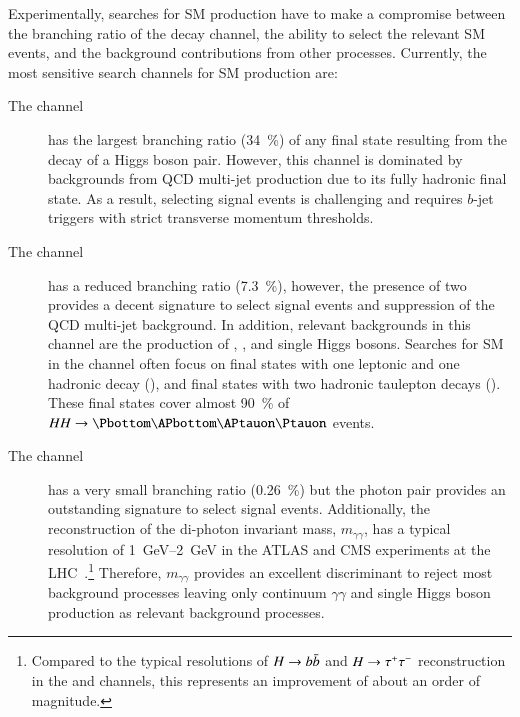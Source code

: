 Experimentally, searches for SM \HH production have to make a compromise between
the branching ratio of the decay channel, the ability to select the relevant SM
\HH events, and the background contributions from other processes. Currently,
the most sensitive search channels for SM \HH production are:
\begin{description}

\item[The \bbbb channel] has the largest branching ratio (\SI{34}{\percent}) of
  any final state resulting from the decay of a Higgs boson pair. However, this
  channel is dominated by backgrounds from QCD multi-jet production due to its
  fully hadronic final state. As a result, selecting signal events is
  challenging and requires $b$-jet triggers with strict transverse momentum
  thresholds.

\item[The \bbtautau channel] has a reduced branching ratio (\SI{7.3}{\percent}),
  however, the presence of two \tauleptons provides a decent signature to select
  signal events and suppression of the QCD multi-jet background. In addition,
  relevant backgrounds in this channel are the production of \ttbar, \Zjets, and
  single Higgs bosons. Searches for SM \HH in the \bbtautau channel often focus
  on final states with one leptonic and one hadronic \taulepton decay (\lephad),
  and final states with two hadronic taulepton decays (\hadhad). These final
  states cover almost \SI{90}{\percent} of $HH \to \bbtautau$ events.

\item[The \bbyy channel] has a very small branching ratio (\SI{0.26}{\percent})
  but the photon pair provides an outstanding signature to select signal
  events. Additionally, the reconstruction of the di-photon invariant mass,
  $m_{\gamma\gamma}$, has a typical resolution of \SIrange{1}{2}{\GeV} in the
  ATLAS and CMS experiments at the
  LHC~\cite{PERF-2007-01,CMS-CMS-00-001}.\footnote{Compared to the typical
    resolutions of $H \to b\bar{b}$ and $H \to \tau^{+} \tau^{-}$ reconstruction in the
    \bbbb and \bbtautau channels, this represents an improvement of about an
    order of magnitude.} Therefore, $m_{\gamma\gamma}$ provides an excellent
  discriminant to reject most background processes leaving only continuum
  $\gamma\gamma$ and single Higgs boson production as relevant background
  processes.

\end{description}

